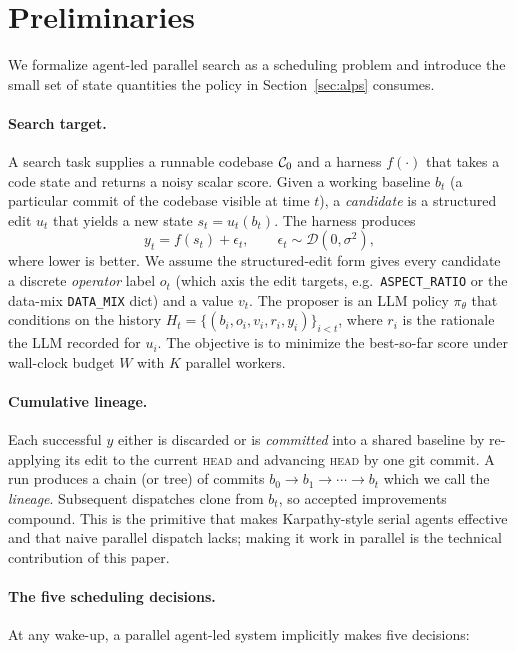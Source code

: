 \documentclass{article}
\newcommand{\HEAD}{\textsc{head}\xspace}
\begin{document}
\section{Preliminaries}
\label{sec:problem}

We formalize agent-led parallel search as a scheduling problem and introduce the small set of state quantities the policy in Section~\ref{sec:alps} consumes.

\paragraph{Search target.}
A search task supplies a runnable codebase ${\cal C}_0$ and a harness $f(\cdot)$ that takes a code state and returns a noisy scalar score. Given a working baseline $b_t$ (a particular commit of the codebase visible at time $t$), a \emph{candidate} is a structured edit $u_t$ that yields a new state $s_t = u_t(b_t)$. The harness produces
\begin{equation}
  y_t = f(s_t) + \epsilon_t, \qquad \epsilon_t \sim \mathcal{D}(0, \sigma^2),
\end{equation}
where lower is better. We assume the structured-edit form gives every candidate a discrete \emph{operator} label $o_t$ (which axis the edit targets, e.g.\ \texttt{ASPECT\_RATIO} or the data-mix \texttt{DATA\_MIX} dict) and a value $v_t$. The proposer is an LLM policy $\pi_\theta$ that conditions on the history $H_t = \{(b_i, o_i, v_i, r_i, y_i)\}_{i<t}$, where $r_i$ is the rationale the LLM recorded for $u_i$. The objective is to minimize the best-so-far score under wall-clock budget $W$ with $K$ parallel workers.

\paragraph{Cumulative lineage.}
Each successful $y$ either is discarded or is \emph{committed} into a shared baseline by re-applying its edit to the current \HEAD and advancing \HEAD by one git commit. A run produces a chain (or tree) of commits $b_0 \to b_1 \to \cdots \to b_t$ which we call the \emph{lineage}. Subsequent dispatches clone from $b_t$, so accepted improvements compound. This is the primitive that makes Karpathy-style serial agents effective and that naive parallel dispatch lacks; making it work in parallel is the technical contribution of this paper.

\paragraph{The five scheduling decisions.}
At any wake-up, a parallel agent-led system implicitly makes five decisions:
\end{document}
